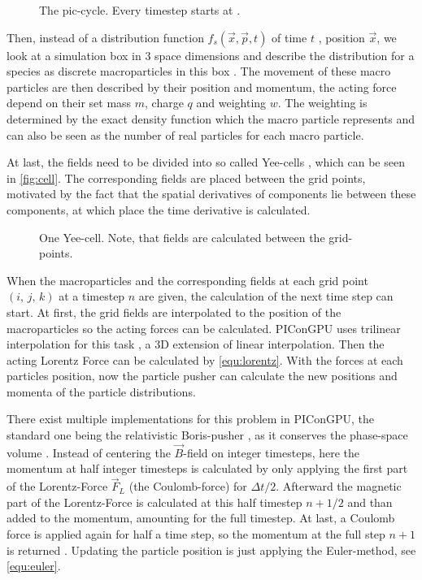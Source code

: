 \documentclass[bachelor_thesis]{subfiles}
\begin{document}
\begin{figure}
	\centering
	\missingfigure{}
	\caption{The \gls{pic}-cycle. Every timestep starts at .}
	\label{fig:cycle}
\end{figure}

Then, instead of a distribution function $f_s(\vec{x}, \vec{p}, t)$ of time $t$ , position $\vec{x}$, we look at a simulation box in 3 space dimensions and describe the distribution for a species as discrete macroparticles in this box \cite{Burau2010}.
The movement of these macro particles are then described by their position and momentum, the acting force depend on their set mass $m$, charge $q$ and weighting $w$.
The weighting is determined by the exact density function which the macro particle represents and can also be seen as the number of real particles for each macro particle.


At last, the fields need to be divided into so called Yee-cells \cite{Yee1966}, which can be seen in \autoref{fig:cell}. The corresponding fields are placed between the grid points, motivated by the fact that the spatial derivatives of components lie between these components, 
at which place the time derivative is calculated.

\begin{figure}
	\centering
	\missingfigure{}
	\caption{One Yee-cell. Note, that fields are calculated between the grid-points.}
	\label{fig:cell}
\end{figure}

When the macroparticles and the corresponding fields at each grid point $(i, \, j, \,k)$ at a timestep $n$ are given, the calculation of the next time step can start.
At first, the grid fields are interpolated to the position of the macroparticles so the acting forces can be calculated. PIConGPU uses trilinear interpolation for this task \cite{Huebl2019, PICRepo}, a 3D extension of linear interpolation.
Then the acting Lorentz Force can be calculated by \autoref{equ:lorentz}. With the forces at each particles position, now the particle pusher can calculate the new positions and momenta of the particle distributions.

There exist multiple implementations for this problem in PIConGPU, the standard one being the relativistic Boris-pusher \cite{Boris1970}, as it conserves the phase-space volume \cite{PICRepo}. Instead of centering the $\vec{B}$-field on integer timesteps, here the momentum at half integer timesteps is
calculated by only applying the first part of the Lorentz-Force $\vec{F}_L$ (the Coulomb-force) for $\Delta t/2$. Afterward the magnetic part of the Lorentz-Force is calculated at this half timestep $n+1/2$ and than added to the momentum, amounting for the full timestep.
At last, a Coulomb force is applied again for half a time step, so the momentum at the full step $n+1$ is returned \cite{Zenitani2018, Pausch2019}. Updating the particle position is just applying the Euler-method, see \autoref{equ:euler}.
\end{document}
